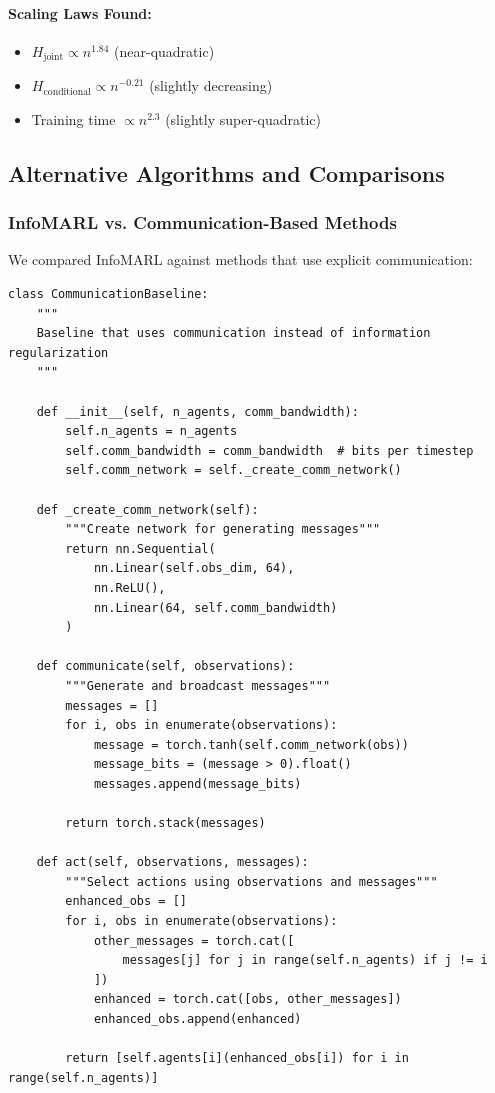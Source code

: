 \documentclass[10pt, letterpaper]{article}
\begin{document}
\paragraph{Scaling Laws Found:}
\begin{itemize}
    \item $H_{\text{joint}} \propto n^{1.84}$ (near-quadratic)
    \item $H_{\text{conditional}} \propto n^{-0.21}$ (slightly decreasing)
    \item Training time $\propto n^{2.3}$ (slightly super-quadratic)
\end{itemize}

\subsection{Alternative Algorithms and Comparisons}

\subsubsection{InfoMARL vs. Communication-Based Methods}

We compared InfoMARL against methods that use explicit communication:

\begin{lstlisting}
class CommunicationBaseline:
    """
    Baseline that uses communication instead of information regularization
    """

    def __init__(self, n_agents, comm_bandwidth):
        self.n_agents = n_agents
        self.comm_bandwidth = comm_bandwidth  # bits per timestep
        self.comm_network = self._create_comm_network()

    def _create_comm_network(self):
        """Create network for generating messages"""
        return nn.Sequential(
            nn.Linear(self.obs_dim, 64),
            nn.ReLU(),
            nn.Linear(64, self.comm_bandwidth)
        )

    def communicate(self, observations):
        """Generate and broadcast messages"""
        messages = []
        for i, obs in enumerate(observations):
            message = torch.tanh(self.comm_network(obs))
            message_bits = (message > 0).float()
            messages.append(message_bits)

        return torch.stack(messages)

    def act(self, observations, messages):
        """Select actions using observations and messages"""
        enhanced_obs = []
        for i, obs in enumerate(observations):
            other_messages = torch.cat([
                messages[j] for j in range(self.n_agents) if j != i
            ])
            enhanced = torch.cat([obs, other_messages])
            enhanced_obs.append(enhanced)

        return [self.agents[i](enhanced_obs[i]) for i in range(self.n_agents)]
\end{lstlisting}
\end{document}
